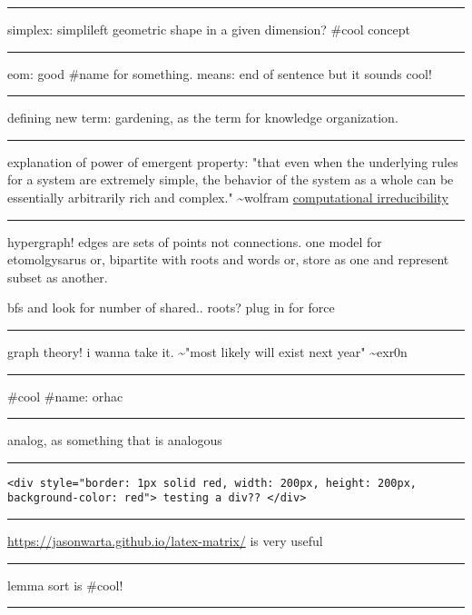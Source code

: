 \documentclass[letterpaper]{article}
\begin{document}
\noindent\rule{\textwidth}{0.5pt}

simplex: simplileft geometric shape in a given dimension? \#cool concept

\noindent\rule{\textwidth}{0.5pt}

eom: good \#name for something. means: end of sentence but it sounds
cool!

\noindent\rule{\textwidth}{0.5pt}

defining new term: gardening, as the term for knowledge organization.

\noindent\rule{\textwidth}{0.5pt}

explanation of power of emergent property: "that even when the
underlying rules for a system are extremely simple, the behavior of the
system as a whole can be essentially arbitrarily rich and complex."
\textasciitilde{}wolfram
\href{https://www.wolframscience.com/nks/p737--computational-irreducibility/}{computational
irreducibility}

\noindent\rule{\textwidth}{0.5pt}

hypergraph! edges are sets of points not connections. one model for
etomolgysarus or, bipartite with roots and words or, store as one and
represent subset as another.

bfs and look for number of shared.. roots? plug in for force

\noindent\rule{\textwidth}{0.5pt}

graph theory! i wanna take it. \textasciitilde{}"most likely will exist next year"
\textasciitilde{}exr0n

\noindent\rule{\textwidth}{0.5pt}

\#cool \#name: orhac

\noindent\rule{\textwidth}{0.5pt}

analog, as something that is analogous

\noindent\rule{\textwidth}{0.5pt}

\begin{verbatim}
<div style="border: 1px solid red, width: 200px, height: 200px, background-color: red"> testing a div?? </div>
\end{verbatim}

\noindent\rule{\textwidth}{0.5pt}

\url{https://jasonwarta.github.io/latex-matrix/} is very useful

\noindent\rule{\textwidth}{0.5pt}

lemma sort is \#cool!

\noindent\rule{\textwidth}{0.5pt}
\end{document}
